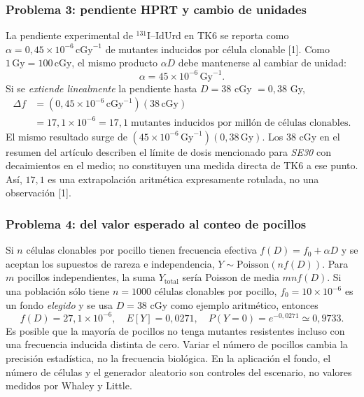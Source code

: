 \documentclass[11pt,a4paper,oneside]{article}
\begin{document}
\subsubsection{Problema 3: pendiente HPRT y cambio de unidades}
La pendiente experimental de $^{131}$I--IdUrd en TK6 se reporta como
$\alpha=0,45\times10^{-6}\,\mathrm{cGy}^{-1}$ de mutantes inducidos por
célula clonable [1]. Como $1\,\mathrm{Gy}=100\,\mathrm{cGy}$, el mismo
producto $\alpha D$ debe mantenerse al cambiar de unidad:
\[
\alpha=45\times10^{-6}\,\mathrm{Gy}^{-1}.
\]
Si se \emph{extiende linealmente} la pendiente hasta $D=38$ cGy
$=0,38$ Gy,
\begin{align}
\Delta f&=(0,45\times10^{-6}\,\mathrm{cGy}^{-1})
                 (38\,\mathrm{cGy})\\
 &=17,1\times10^{-6}
 =17,1\;\text{mutantes inducidos por millón de células clonables}.
\end{align}
El mismo resultado surge de $(45\times10^{-6}\,\mathrm{Gy}^{-1})(0,38\,
\mathrm{Gy})$. Los 38 cGy en el resumen del artículo describen el límite
de dosis mencionado para \emph{SE30} con decaimientos en el medio; no
constituyen una medida directa de TK6 a ese punto. Así, $17,1$ es una
extrapolación aritmética expresamente rotulada, no una observación [1].

\subsubsection{Problema 4: del valor esperado al conteo de pocillos}
Si $n$ células clonables por pocillo tienen frecuencia efectiva
$f(D)=f_0+\alpha D$ y se aceptan los supuestos de rareza e independencia,
$Y\sim\mathrm{Poisson}(nf(D))$. Para $m$ pocillos independientes,
la suma $Y_\mathrm{total}$ sería Poisson de media $mnf(D)$.
Si una población sólo tiene $n=1000$ células clonables por pocillo,
$f_0=10\times10^{-6}$ es un fondo \emph{elegido} y se usa
$D=38$ cGy como ejemplo aritmético, entonces
\[
f(D)=27,1\times10^{-6},\quad
E[Y]=0,0271,\quad P(Y=0)=e^{-0,0271}\simeq0,9733.
\]
Es posible que la mayoría de pocillos no tenga mutantes resistentes
incluso con una frecuencia inducida distinta de cero. Variar el número
de pocillos cambia la precisión estadística, no la frecuencia biológica.
En la aplicación el fondo, el número de células y el generador aleatorio
son controles del escenario, no valores medidos por Whaley y Little.
\end{document}
